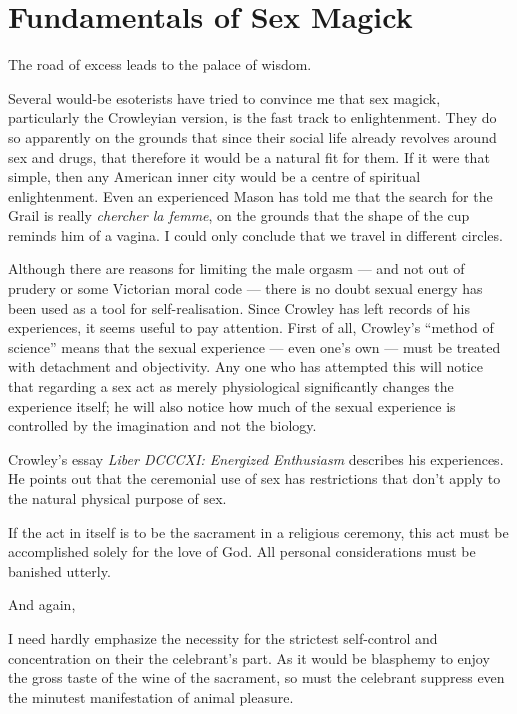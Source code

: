 \section{Fundamentals of Sex Magick}

\begin{quotex}
The road of excess leads to the palace of wisdom.
\end{quotex}


Several would-be esoterists have tried to convince me that sex magick, particularly the Crowleyian version, is the fast track to enlightenment. They do so apparently on the grounds that since their social life already revolves around sex and drugs, that therefore it would be a natural fit for them. If it were that simple, then any American inner city would be a centre of spiritual enlightenment. Even an experienced Mason has told me that the search for the Grail is really \emph{chercher la femme}, on the grounds that the shape of the cup reminds him of a vagina. I could only conclude that we travel in different circles.

Although there are reasons for limiting the male orgasm --- and not out of prudery or some Victorian moral code --- there is no doubt sexual energy has been used as a tool for self-realisation. Since Crowley has left records of his experiences, it seems useful to pay attention. First of all, Crowley's ``method of science'' means that the sexual experience --- even one's own --- must be treated with detachment and objectivity. Any one who has attempted this will notice that regarding a sex act as merely physiological significantly changes the experience itself; he will also notice how much of the sexual experience is controlled by the imagination and not the biology.

Crowley's essay \emph{Liber DCCCXI: Energized Enthusiasm} describes his experiences. He points out that the ceremonial use of sex has restrictions that don't apply to the natural physical purpose of sex.

\begin{quotex}
If the act in itself is to be the sacrament in a religious ceremony, this act must be accomplished solely for the love of God. All personal considerations must be banished utterly.
\end{quotex}


And again,

\begin{quotex}
I need hardly emphasize the necessity for the strictest self-control and concentration on their the celebrant's part. As it would be blasphemy to enjoy the gross taste of the wine of the sacrament, so must the celebrant suppress even the minutest manifestation of animal pleasure.
\end{quotex}


